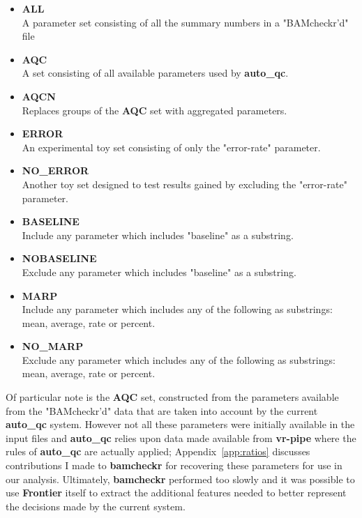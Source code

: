 \begin{itemize}
    \item \textbf{ALL} \hfill\\
        A parameter set consisting of all the summary numbers in a "BAMcheckr'd"
        file
    \item \textbf{AQC} \hfill\\
        A set consisting of all available parameters used by \textbf{auto\_qc}.
    \item \textbf{AQCN} \hfill\\
        Replaces groups of the \textbf{AQC} set with aggregated parameters.
    \item \textbf{ERROR} \hfill\\
        An experimental toy set consisting of only the "error-rate" parameter.
    \item \textbf{NO\_ERROR} \hfill\\
        Another toy set designed to test results gained by excluding the
        "error-rate" parameter.
    \item \textbf{BASELINE} \hfill\\
        Include any parameter which includes "baseline" as a substring.
    \item \textbf{NOBASELINE} \hfill\\
        Exclude any parameter which includes "baseline" as a substring.
    \item \textbf{MARP} \hfill\\
        Include any parameter which includes any of the following as substrings:
        mean, average, rate or percent.
    \item \textbf{NO\_MARP} \hfill\\
        Exclude any parameter which includes any of the following as substrings:
        mean, average, rate or percent.
\end{itemize}

Of particular note is the \textbf{AQC} set, constructed from the parameters
available from the "BAMcheckr'd" data that are taken into account by the
current \textbf{auto\_qc} system. However not all these
parameters were initially available in the input files and \textbf{auto\_qc}
relies upon data made available from \textbf{vr-pipe} where the rules of
\textbf{auto\_qc} are actually applied; Appendix~\ref{app:ratios} discusses
contributions I made to \textbf{bamcheckr} for recovering these parameters for
use in our analysis. Ultimately, \textbf{bamcheckr} performed too slowly and it
was possible to use \textbf{Frontier} itself to extract the additional features
needed to better represent the decisions made by the current system.

